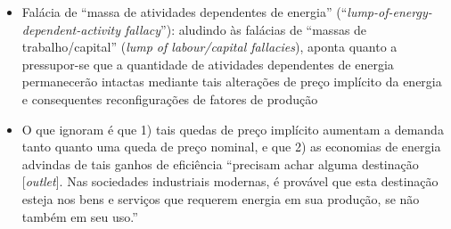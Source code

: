 \begin{itemize}
    \item Falácia de ``massa de atividades dependentes de energia'' (``\textit{lump-of-energy-dependent-activity fallacy}''): aludindo às falácias de ``massas de trabalho/capital'' (\textit{lump of labour/capital fallacies}), aponta quanto a pressupor-se que a quantidade de atividades dependentes de energia permanecerão intactas mediante tais alterações de preço implícito da energia e consequentes reconfigurações de fatores de produção 
    \item O que ignoram é que 1) tais quedas de preço implícito aumentam a demanda tanto quanto uma queda de preço nominal, e que 2) as economias de energia advindas de tais ganhos de eficiência ``precisam achar alguma destinação [\textit{outlet}]. Nas sociedades industriais modernas, é provável que esta destinação esteja nos bens e serviços que requerem energia em sua produção, se não também em seu uso.'' \parencite[p. 321]{Brookes2000}
\end{itemize}
